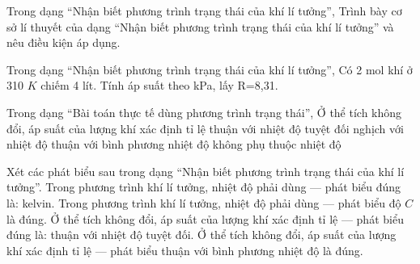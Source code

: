 \begin{ex}
Trong dạng “Nhận biết phương trình trạng thái của khí lí tưởng”, Trình bày cơ sở lí thuyết của dạng “Nhận biết phương trình trạng thái của khí lí tưởng” và nêu điều kiện áp dụng.
\choiceTF

\end{ex}

\begin{ex}
Trong dạng “Nhận biết phương trình trạng thái của khí lí tưởng”, Có 2 mol khí ở 310 $K$ chiếm 4 lít. Tính áp suất theo kPa, lấy R=8,31.
\end{ex}

\begin{ex}
Trong dạng “Bài toán thực tế dùng phương trình trạng thái”, Ở thể tích không đổi, áp suất của lượng khí xác định tỉ lệ
\choice
{\True thuận với nhiệt độ tuyệt đối}
{nghịch với nhiệt độ}
{thuận với bình phương nhiệt độ}
{không phụ thuộc nhiệt độ}
\end{ex}

\begin{ex}
Xét các phát biểu sau trong dạng “Nhận biết phương trình trạng thái của khí lí tưởng”.
\choiceTF
{\True Trong phương trình khí lí tưởng, nhiệt độ phải dùng — phát biểu đúng là: kelvin.}
{Trong phương trình khí lí tưởng, nhiệt độ phải dùng — phát biểu độ $C$ là đúng.}
{\True Ở thể tích không đổi, áp suất của lượng khí xác định tỉ lệ — phát biểu đúng là: thuận với nhiệt độ tuyệt đối.}
{Ở thể tích không đổi, áp suất của lượng khí xác định tỉ lệ — phát biểu thuận với bình phương nhiệt độ là đúng.}
\end{ex}

